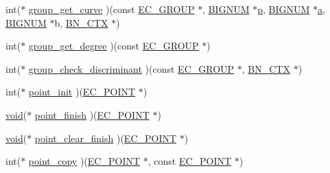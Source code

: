 \begin{DoxyCompactItemize}
\item 
int($\ast$ \hyperlink{structec__method__st_a9c81f1473076ba3a9b85a7ecf8d84e64}{group\+\_\+get\+\_\+curve} )(const \hyperlink{crypto_2ec_2ec_8h_aca3c2dfa5546740e0f575013960a598a}{E\+C\+\_\+\+G\+R\+O\+UP} $\ast$, \hyperlink{crypto_2ossl__typ_8h_a6fb19728907ec6515e4bfb716bffa141}{B\+I\+G\+N\+UM} $\ast$\hyperlink{ssl__locl_8h_a4014c6f4a6fa0e565ca592bcaca0fa58}{p}, \hyperlink{crypto_2ossl__typ_8h_a6fb19728907ec6515e4bfb716bffa141}{B\+I\+G\+N\+UM} $\ast$\hyperlink{hpux_8cc_af3e37283d97a42ffc096d8958a745f32}{a}, \hyperlink{crypto_2ossl__typ_8h_a6fb19728907ec6515e4bfb716bffa141}{B\+I\+G\+N\+UM} $\ast$b, \hyperlink{crypto_2ossl__typ_8h_a0b235a35b7dd7922c097571ecd90e2bc}{B\+N\+\_\+\+C\+TX} $\ast$)
\item 
int($\ast$ \hyperlink{structec__method__st_a7cad48923884aa4c25e0fcf5fa3ee8cc}{group\+\_\+get\+\_\+degree} )(const \hyperlink{crypto_2ec_2ec_8h_aca3c2dfa5546740e0f575013960a598a}{E\+C\+\_\+\+G\+R\+O\+UP} $\ast$)
\item 
int($\ast$ \hyperlink{structec__method__st_a9b8420c7993b639854fea6cd647dc099}{group\+\_\+check\+\_\+discriminant} )(const \hyperlink{crypto_2ec_2ec_8h_aca3c2dfa5546740e0f575013960a598a}{E\+C\+\_\+\+G\+R\+O\+UP} $\ast$, \hyperlink{crypto_2ossl__typ_8h_a0b235a35b7dd7922c097571ecd90e2bc}{B\+N\+\_\+\+C\+TX} $\ast$)
\item 
int($\ast$ \hyperlink{structec__method__st_abde6e8aebd34176fe9309bf0c7d1903d}{point\+\_\+init} )(\hyperlink{crypto_2ec_2ec_8h_ab372a34de16c42eb0ccfa63be0ad985f}{E\+C\+\_\+\+P\+O\+I\+NT} $\ast$)
\item 
\hyperlink{hw__4758__cca_8h_afad4d591c7931ff6dc5bf69c76c96aa0}{void}($\ast$ \hyperlink{structec__method__st_ae208c9fe446f677c9e052e05c11f609b}{point\+\_\+finish} )(\hyperlink{crypto_2ec_2ec_8h_ab372a34de16c42eb0ccfa63be0ad985f}{E\+C\+\_\+\+P\+O\+I\+NT} $\ast$)
\item 
\hyperlink{hw__4758__cca_8h_afad4d591c7931ff6dc5bf69c76c96aa0}{void}($\ast$ \hyperlink{structec__method__st_aa133b0ec8ec4a72b691450457164490a}{point\+\_\+clear\+\_\+finish} )(\hyperlink{crypto_2ec_2ec_8h_ab372a34de16c42eb0ccfa63be0ad985f}{E\+C\+\_\+\+P\+O\+I\+NT} $\ast$)
\item 
int($\ast$ \hyperlink{structec__method__st_a76d2d81486721b8f493df8453ea97d12}{point\+\_\+copy} )(\hyperlink{crypto_2ec_2ec_8h_ab372a34de16c42eb0ccfa63be0ad985f}{E\+C\+\_\+\+P\+O\+I\+NT} $\ast$, const \hyperlink{crypto_2ec_2ec_8h_ab372a34de16c42eb0ccfa63be0ad985f}{E\+C\+\_\+\+P\+O\+I\+NT} $\ast$)
\item 

\end{DoxyCompactItemize}
